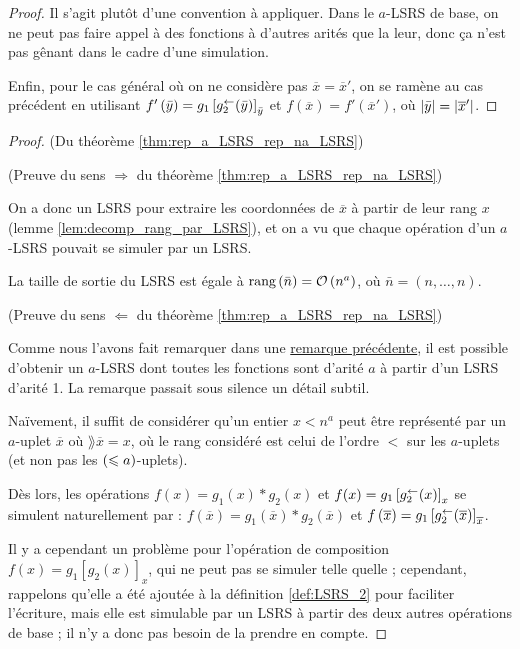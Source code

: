 \begin{proof}
		Il s'agit plutôt d'une convention à appliquer. Dans le $a$-LSRS de base, on ne peut pas faire appel à des fonctions à d'autres arités que la leur, donc ça n'est pas gênant dans le cadre d'une simulation.
		

		
		Enfin, pour le cas général où on ne considère pas $\overline{x} = \overline{x}'$, on se ramène au cas précédent en utilisant $f'\left( \bar{y} \right) = g_1\left[ g_2^{\leftarrow}(\bar{y}) \right]_{\bar{y}}$ et $f\left( \overline{x} \right) = f'\left( \overline{x}' \right)$, où $\left|\bar{y}\right| = \left|\overline{x}'\right|$.
		
	\end{proof}
	
	
	\begin{proof} (Du théorème \ref{thm:rep_a_LSRS_rep_na_LSRS})
		
		(Preuve du sens $\Rightarrow$ du théorème \ref{thm:rep_a_LSRS_rep_na_LSRS})
		
		On a donc un LSRS pour extraire les coordonnées de $\overline{x}$ à partir de leur rang $x$ (lemme \ref{lem:decomp_rang_par_LSRS}), et on a vu que chaque opération d'un $a$-LSRS pouvait se simuler par un LSRS.
		
		La taille de sortie du LSRS est égale à $\text{rang}\left( \bar{n} \right) = \mathcal{O}\left( n ^a \right)$, où $\bar{n} = \left( n, \dots, n\right)$.
		
		\espace
		
		(Preuve du sens $\Leftarrow$ du théorème \ref{thm:rep_a_LSRS_rep_na_LSRS})
		
		Comme nous l'avons fait remarquer dans une \hyperref[rmq:choix_arites]{remarque précédente}, il est possible d'obtenir un $a$-LSRS dont toutes les fonctions sont d'arité $a$ à partir d'un LSRS d'arité 1. La remarque passait sous silence un détail subtil.
		
		Naïvement, il suffit de considérer qu'un entier $x < n^a$ peut être représenté par un $a$-uplet $\overline{x}$ où $\rang{\overline{x}} = x$, où le rang considéré est celui de l'ordre $<$ sur les $a$-uplets (et non pas les $\left( \leqslant a \right)$-uplets).
		
		Dès lors, les opérations $f(x) = g_1(x) * g_2(x)$ et $f(x) = g_1\left[ g_2^{\leftarrow}(x) \right]_{x}$ se simulent naturellement par : $f\left(\overline{x}\right) = g_1\left(\overline{x}\right) * g_2\left(\overline{x}\right)$ et $f\left(\overline{x}\right) = g_1\left[ g_2^{\leftarrow}(\overline{x}) \right]_{\overline{x}}$.
		
		Il y a cependant un problème pour l'opération de composition $f(x) = g_1\left[g_2(x)\right]_x$, qui ne peut pas se simuler telle quelle ; cependant, rappelons qu'elle a été ajoutée à la définition \ref{def:LSRS_2} pour faciliter l'écriture, mais elle est simulable par un LSRS à partir des deux autres opérations de base \cite{GrandjeanSchwentick2002} ; il n'y a donc pas besoin de la prendre en compte.
	\end{proof}
	

